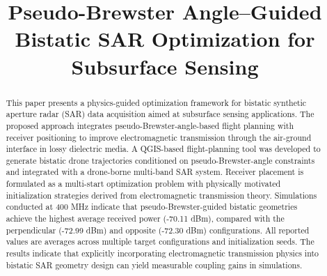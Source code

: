 \documentclass[conference]{IEEEtran}
\begin{document}
\title{Pseudo-Brewster Angle–Guided Bistatic SAR Optimization for Subsurface Sensing}

\author{

\vspace{2pt}
\rule{0.0\linewidth}{0.4pt}
\vspace{4pt}


\vspace{4pt}
}

\maketitle

\begin{abstract}
This paper presents a physics-guided optimization framework for bistatic synthetic aperture radar (SAR) data acquisition aimed at subsurface sensing applications. The proposed approach integrates pseudo-Brewster-angle-based flight planning with receiver positioning to improve electromagnetic transmission through the air-ground interface in lossy dielectric media. A QGIS-based flight-planning tool was developed to generate bistatic drone trajectories conditioned on pseudo-Brewster-angle constraints and integrated with a drone-borne multi-band SAR system. Receiver placement is formulated as a multi-start optimization problem with physically motivated initialization strategies derived from electromagnetic transmission theory. Simulations conducted at 400 MHz indicate that pseudo-Brewster-guided bistatic geometries achieve the highest average received power (-70.11 dBm), compared with the perpendicular (-72.99 dBm) and opposite (-72.30 dBm) configurations. All reported values are averages across multiple target configurations and initialization seeds. The results indicate that explicitly incorporating electromagnetic transmission physics into bistatic SAR geometry design can yield measurable coupling gains in simulations.
\end{abstract}
\end{document}
